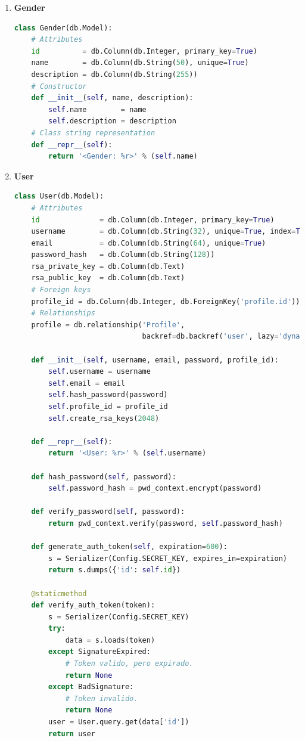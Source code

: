 \begin{enumerate}
\item \textbf{Gender}
	
\begin{lstlisting}[language=Python]
class Gender(db.Model):
    # Attributes
    id          = db.Column(db.Integer, primary_key=True)
    name        = db.Column(db.String(50), unique=True)
    description = db.Column(db.String(255))
	# Constructor
    def __init__(self, name, description):
        self.name        = name
        self.description = description
	# Class string representation
    def __repr__(self):
        return '<Gender: %r>' % (self.name)
\end{lstlisting}
	
\item \textbf{User}
	
\begin{lstlisting}[language=Python]
class User(db.Model):
    # Attributes
    id              = db.Column(db.Integer, primary_key=True)
    username        = db.Column(db.String(32), unique=True, index=True)
    email           = db.Column(db.String(64), unique=True)
    password_hash   = db.Column(db.String(128))
    rsa_private_key = db.Column(db.Text)
    rsa_public_key  = db.Column(db.Text)
    # Foreign keys
    profile_id = db.Column(db.Integer, db.ForeignKey('profile.id'))
    # Relationships
    profile = db.relationship('Profile',
                              backref=db.backref('user', lazy='dynamic'))

    def __init__(self, username, email, password, profile_id):
        self.username = username
        self.email = email
        self.hash_password(password)
        self.profile_id = profile_id
        self.create_rsa_keys(2048)

    def __repr__(self):
        return '<User: %r>' % (self.username)

    def hash_password(self, password):
        self.password_hash = pwd_context.encrypt(password)

    def verify_password(self, password):
        return pwd_context.verify(password, self.password_hash)

    def generate_auth_token(self, expiration=600):
        s = Serializer(Config.SECRET_KEY, expires_in=expiration)
        return s.dumps({'id': self.id})

    @staticmethod
    def verify_auth_token(token):
        s = Serializer(Config.SECRET_KEY)
        try:
            data = s.loads(token)
        except SignatureExpired:
            # Token valido, pero expirado.
            return None
        except BadSignature:
            # Token invalido.
            return None
        user = User.query.get(data['id'])
        return user


\end{lstlisting}
\end{enumerate}
